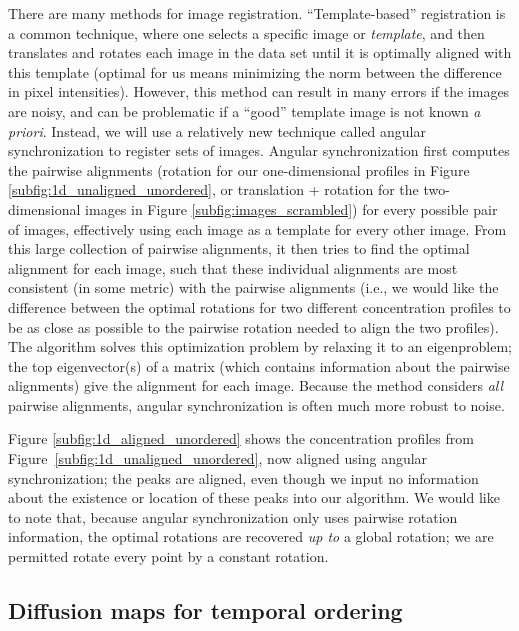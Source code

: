 \documentclass{pnastwo}
\begin{document}
\begin{article}
There are many methods for image registration. 
%
``Template-based'' registration \cite{ahuja2007template} is a common technique, where one selects a specific image or {\em template}, and then translates and rotates each image in the data set until it is optimally aligned with this template (optimal for us means minimizing the norm between the difference in pixel intensities).
%
However, this method can result in many errors if the images are noisy, and can be problematic if a ``good'' template image is not known {\em a priori}. 
%
Instead, we will use a relatively new technique called angular synchronization\cite{singer2011angular} to register sets of images.
%
Angular synchronization first computes the pairwise alignments (rotation for our one-dimensional profiles in Figure \ref{subfig:1d_unaligned_unordered}, or translation + rotation for the two-dimensional images in Figure \ref{subfig:images_scrambled}) for every possible pair of images, effectively using each image as a template for every other image.
%
From this large collection of pairwise alignments, it then tries to find the optimal alignment for each image, such that these individual alignments are most consistent (in some metric) with the pairwise alignments (i.e., we would like the difference between the optimal rotations for two different concentration profiles to be as close as possible to the pairwise rotation needed to align the two profiles).
%
The algorithm solves this optimization problem by relaxing it to an eigenproblem; the top eigenvector(s) of a matrix (which contains information about the pairwise alignments) give the alignment for each image.
%
Because the method considers {\em all} pairwise alignments, angular synchronization is often much more robust to noise. 

Figure \ref{subfig:1d_aligned_unordered} shows the concentration profiles from Figure~\ref{subfig:1d_unaligned_unordered}, now aligned using angular synchronization;
the peaks are aligned, even though we input no information about the existence or location of these peaks into our algorithm.
%
We would like to note that, because angular synchronization only uses pairwise rotation information, the optimal rotations are recovered {\em up to} a global rotation; we are permitted rotate every point by a constant rotation.

\subsection{Diffusion maps for temporal ordering}


\end{article}
\end{document}
